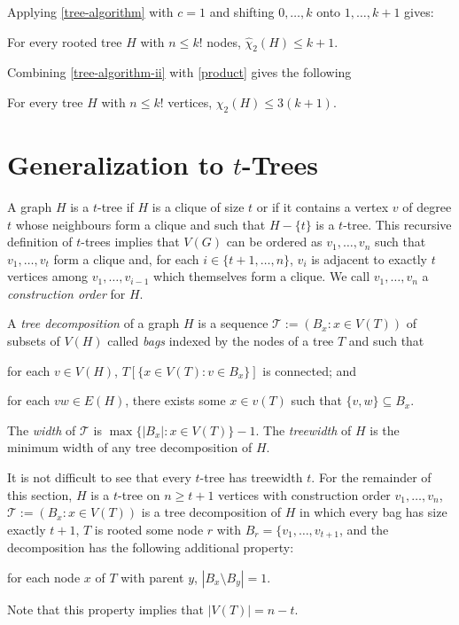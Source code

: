 \documentclass[kpfonts]{patmorin}
\newcommand{\uqs}{\chi_2}
\newcommand{\hus}{\hat{\chi}_2}
\begin{document}
Applying \cref{tree-algorithm} with $c=1$ and shifting $0,\ldots,k$ onto $1,\ldots,k+1$ gives:

\begin{cor}\label{tree-algorithm-ii}
    For every rooted tree $H$ with $n\le k!$ nodes, $\hus(H)\le k+1$.
\end{cor}

Combining \cref{tree-algorithm-ii} with \cref{product} gives the following
\begin{thm}
    For every tree $H$ with $n\le k!$ vertices, $\uqs(H)\le 3(k+1)$.
\end{thm}


\section{Generalization to $t$-Trees}



A graph $H$ is a $t$-tree if $H$ is a clique of size $t$ or if it contains a vertex $v$ of degree $t$ whose neighbours form a clique and such that $H-\{t\}$ is a $t$-tree.  This recursive definition of $t$-trees implies that $V(G)$ can be ordered as $v_1,\ldots,v_n$ such that $v_1,\ldots,v_t$ form a clique and, for each $i\in\{t+1,\ldots,n\}$, $v_i$ is adjacent to exactly $t$ vertices among $v_1,\ldots,v_{i-1}$ which themselves form a clique.  We call $v_1,\ldots,v_n$ a \emph{construction order} for $H$.

A \emph{tree decomposition} of a graph $H$ is a sequence $\mathcal{T}:=(B_x:x\in V(T))$ of subsets of $V(H)$ called \emph{bags} indexed by the nodes of a tree $T$ and such that
\begin{inparaenum}[(i)]
    \item for each $v\in V(H)$, $T[\{x\in V(T):v\in B_x\}]$ is connected; and
    \item for each $vw\in E(H)$, there exists some $x\in v(T)$ such that $\{v,w\}\subseteq B_x$.
\end{inparaenum}
The \emph{width} of $\mathcal{T}$ is $\max\{|B_x|:x\in V(T)\}-1$. The \emph{treewidth} of $H$ is the minimum width of any tree decomposition of $H$.

It is not difficult to see that every $t$-tree has treewidth $t$.  For the remainder of this section, $H$ is a $t$-tree on $n\ge t+1$ vertices with construction order $v_1,\ldots,v_n$, $\mathcal{T}:=(B_x:x\in V(T))$ is a tree decomposition of $H$ in which every bag has size exactly $t+1$, $T$ is rooted some node $r$ with $B_r=\{v_1,\ldots,v_{t+1}$, and the decomposition has the following additional property:
\begin{inparaenum}[(i)]\setcounter{enumi}{2}
  \item for each node $x$ of $T$ with parent $y$, $|B_x\setminus B_y|=1$.
\end{inparaenum}
Note that this property implies that $|V(T)|=n-t$.
\end{document}
